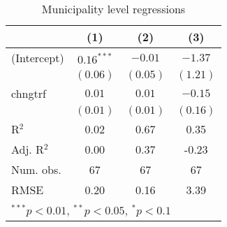 
\begin{table}
\caption{Municipality level regressions}
\begin{center}
\begin{tabular}{l c c c }
\hline
 & (1) & (2) & (3) \\
\hline
(Intercept) & $0.16^{***}$ & $-0.01$  & $-1.37$  \\
            & $(0.06)$     & $(0.05)$ & $(1.21)$ \\
chngtrf     & $0.01$       & $0.01$   & $-0.15$  \\
            & $(0.01)$     & $(0.01)$ & $(0.16)$ \\
\hline
R$^2$       & 0.02         & 0.67     & 0.35     \\
Adj. R$^2$  & 0.00         & 0.37     & -0.23    \\
Num. obs.   & 67           & 67       & 67       \\
RMSE        & 0.20         & 0.16     & 3.39     \\
\hline
\multicolumn{4}{l}{\scriptsize{$^{***}p<0.01$, $^{**}p<0.05$, $^*p<0.1$}}
\end{tabular}
\label{table:coefficients}
\end{center}
\end{table}
